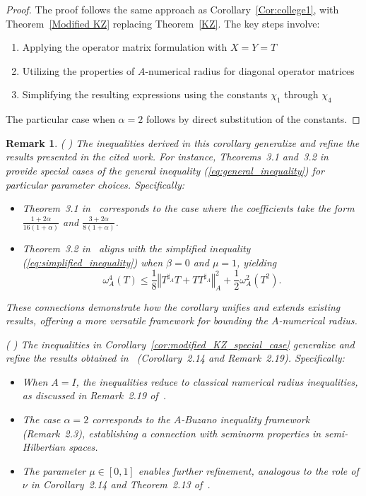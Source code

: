 \documentclass{article}
\newcommand{\norm}[1]{\left\Vert#1\right\Vert}
\newtheorem{remark}[theorem]{Remark}
\begin{document}
\begin{proof}
The proof follows the same approach as Corollary~\ref{Cor:college1}, with Theorem~\ref{Modified KZ} replacing Theorem~\ref{KZ}. The key steps involve:
\begin{enumerate}
    \item Applying the operator matrix formulation with $X = Y = T$
    \item Utilizing the properties of $A$-numerical radius for diagonal operator matrices
    \item Simplifying the resulting expressions using the constants $\chi_1$ through $\chi_4$
\end{enumerate}
The particular case when $\alpha = 2$ follows by direct substitution of the constants.
\end{proof}
\begin{remark}
\textup{(
)} The inequalities derived in this corollary generalize and refine the results presented in the cited work. For instance, Theorems~3.1 and~3.2 in~\cite{QHC} provide special cases of the general inequality (\ref{eq:general_inequality}) for particular parameter choices. Specifically:
\begin{itemize}
    \item Theorem~3.1 in~\cite{QHC} corresponds to the case where the coefficients take the form $\frac{1+2\alpha}{16(1+\alpha)}$ and $\frac{3+2\alpha}{8(1+\alpha)}$.
    \item Theorem~3.2 in~\cite{QHC} aligns with the simplified inequality (\ref{eq:simplified_inequality}) when $\beta = 0$ and $\mu = 1$, yielding
    \[
    \omega_A^4(T) \leq \frac{1}{8} \norm{T^{\sharp_A}T + TT^{\sharp_A}}_A^2 + \frac{1}{2} \omega_A^2(T^2).
    \]
\end{itemize}
These connections demonstrate how the corollary unifies and extends existing results, offering a more versatile framework for bounding the $A$-numerical radius.

\textup{(
)} The inequalities in Corollary~\ref{cor:modified_KZ_special_case} generalize and refine the results obtained in~\cite{KZ} (Corollary~2.14 and Remark~2.19). Specifically:
\begin{itemize}
    \item When $A = I$, the inequalities reduce to classical numerical radius inequalities, as discussed in Remark~2.19 of~\cite{KZ}.
    \item The case $\alpha = 2$ corresponds to the $A$-Buzano inequality framework (Remark~2.3), establishing a connection with seminorm properties in semi-Hilbertian spaces.
    \item The parameter $\mu \in [0,1]$ enables further refinement, analogous to the role of $\nu$ in Corollary~2.14 and Theorem~2.13 of~\cite{KZ}.
\end{itemize}
\end{remark}
\end{document}
